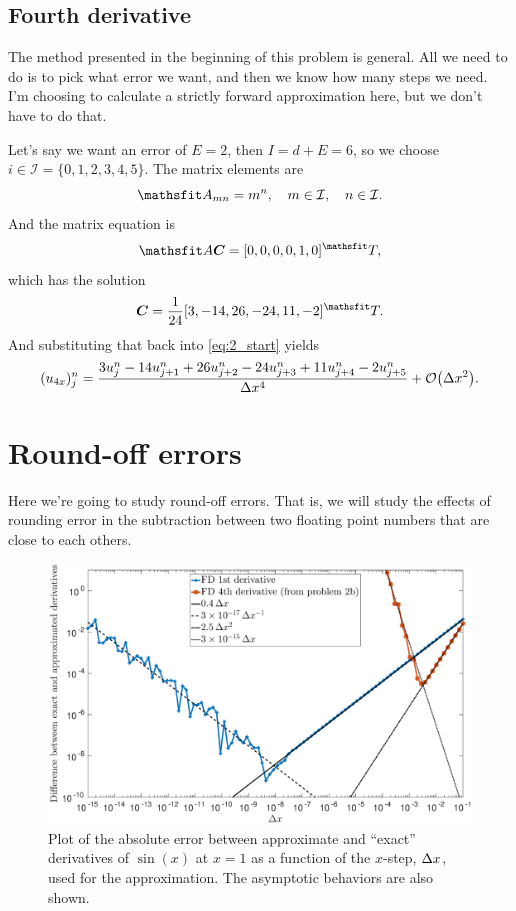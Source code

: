 \documentclass[11pt,letter, swedish, english
]{article}
\begin{document}
\subsection{Fourth derivative}
The method presented in the beginning of this problem is general. All
we need to do is to pick what error we want, and then we know how many
steps we need. I'm choosing to calculate a strictly forward
approximation here, but we don't have to do that.

Let's say we want an error of $E=2$, then $I=d+E=6$, so we choose
$i\in\mathcal{I}=\{0, 1, 2, 3, 4, 5\}$. The matrix elements are 
\begin{equation}
\mathsf{A}_{mn}=m^{n}
\qcomma m\in\mathcal{I}\qcomma n\in\mathcal{I}.
\end{equation}
And the matrix equation is
\begin{equation}
\mathsf{A}\vb*{C}=[0, 0, 0, 0, 1, 0]^\mathsf{T},
\end{equation}
which has the solution
\begin{equation}
\vb*{C}=\frac{1}{24} [3, -14, 26, -24, 11, -2]^\mathsf{T}.
\end{equation}
And substituting that back into \eqref{eq:2_start} yields
\begin{equation}
(u_{4x})_j^n=\frac{3u_{j}^n-14u_{j+1}^n+26u_{j+2}^n-24u_{j+3}^n+11u_{j+4}^n-2u_{j+5}^n}{\Dx^4}
+\order{\Dx^2}.
\end{equation}


\section{Round-off errors}
Here we're going to study round-off errors. That is, we will
study the effects of rounding error in the subtraction between two
floating point numbers that are close to each others. 

\begin{figure}\centerline{
\includegraphics[width=1.2\textwidth]{3_FD.eps}}
\caption{Plot of the absolute error between approximate and ``exact''
  derivatives of $\sin(x)$ at $x=1$ as a function of the $x$-step,
  $\Delta{x}$, used for the approximation. The asymptotic behaviors are
  also shown.}
\label{fig:3_error}
\end{figure}
\end{document}
